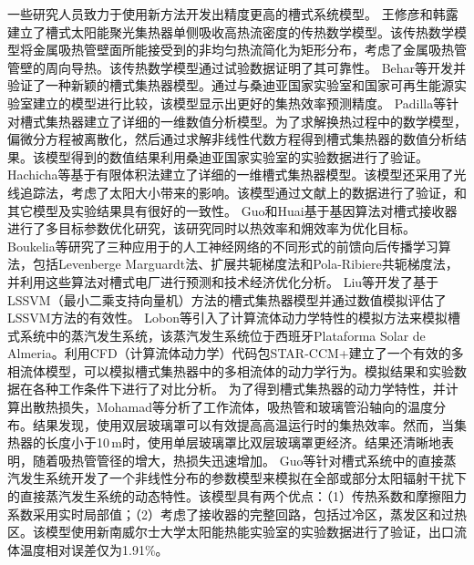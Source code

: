 一些研究人员致力于使用新方法开发出精度更高的槽式系统模型。
王修彦和韩露\cite{Wang2017a}建立了槽式太阳能聚光集热器单侧吸收高热流密度的传热数学模型。该传热数学模型将金属吸热管壁面所能接受到的非均匀热流简化为矩形分布，考虑了金属吸热管管壁的周向导热。该传热数学模型通过试验数据证明了其可靠性。
Behar等\cite{Behar2015}开发并验证了一种新颖的槽式集热器模型。通过与桑迪亚国家实验室和国家可再生能源实验室建立的模型进行比较，该模型显示出更好的集热效率预测精度。
Padilla等\cite{Padilla2011}针对槽式集热器建立了详细的一维数值分析模型。为了求解换热过程中的数学模型，偏微分方程被离散化，然后通过求解非线性代数方程得到槽式集热器的数值分析结果。该模型得到的数值结果利用桑迪亚国家实验室的实验数据进行了验证。
Hachicha等\cite{Hachicha2013}基于有限体积法建立了详细的一维槽式集热器模型。该模型还采用了光线追踪法，考虑了太阳大小带来的影响。该模型通过文献上的数据进行了验证，和其它模型及实验结果具有很好的一致性。
Guo和Huai\cite{JiangfengGuo2016-2}基于基因算法对槽式接收器进行了多目标参数优化研究，该研究同时以热效率和㶲效率为优化目标。
Boukelia等\cite{Boukelia2016}研究了三种应用于的人工神经网络的不同形式的前馈向后传播学习算法，包括Levenberge Marguardt法、扩展共轭梯度法和Pola-Ribiere共轭梯度法，并利用这些算法对槽式电厂进行预测和技术经济优化分析。
Liu等\cite{Liu2012}开发了基于LSSVM（最小二乘支持向量机）方法的槽式集热器模型并通过数值模拟评估了LSSVM方法的有效性。
Lobon等\cite{Lobon2014}引入了计算流体动力学特性的模拟方法来模拟槽式系统中的蒸汽发生系统，该蒸汽发生系统位于西班牙Plataforma Solar de Almeria。利用CFD（计算流体动力学）代码包STAR-CCM+建立了一个有效的多相流体模型，可以模拟槽式集热器中的多相流体的动力学行为。模拟结果和实验数据在各种工作条件下进行了对比分析。
为了得到槽式集热器的动力学特性，并计算出散热损失，Mohamad等\cite{Mohamad2014}分析了工作流体，吸热管和玻璃管沿轴向的温度分布。结果发现，使用双层玻璃罩可以有效提高高温运行时的集热效率。然而，当集热器的长度小于10$\,\mathrm{m}$时，使用单层玻璃罩比双层玻璃罩更经济。结果还清晰地表明，随着吸热管管径的增大，热损失迅速增加。
Guo等\cite{SuGuo2016}针对槽式系统中的直接蒸汽发生系统开发了一个非线性分布的参数模型来模拟在全部或部分太阳辐射干扰下的直接蒸汽发生系统的动态特性。该模型具有两个优点：（1）传热系数和摩擦阻力系数采用实时局部值；（2）考虑了接收器的完整回路，包括过冷区，蒸发区和过热区。该模型使用新南威尔士大学太阳能热能实验室的实验数据进行了验证，出口流体温度相对误差仅为1.91\%。

